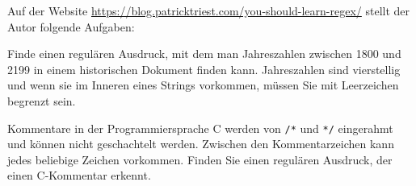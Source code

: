 Auf der Website 
\url{https://blog.patricktriest.com/you-should-learn-regex/}
stellt der Autor folgende Aufgaben:
\begin{teilaufgaben}
\item
Finde einen regulären Ausdruck, mit dem man Jahreszahlen zwischen
1800 und 2199 in einem
historischen Dokument finden kann.
Jahreszahlen sind vierstellig und wenn sie im Inneren eines
Strings vorkommen, müssen Sie mit Leerzeichen begrenzt sein.
\item
Kommentare in der Programmiersprache C werden von \texttt{/*} und
\texttt{*/} eingerahmt und können nicht geschachtelt werden.
Zwischen den Kommentarzeichen kann jedes beliebige Zeichen vorkommen.
Finden Sie einen regulären Ausdruck, der einen C-Kommentar
erkennt.
\end{teilaufgaben}


